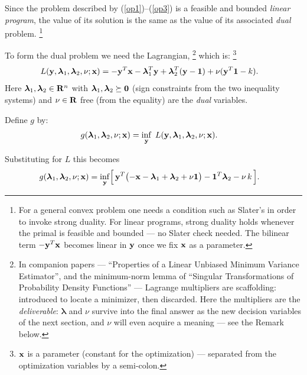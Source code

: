 \documentclass[12pt]{article}
\begin{document}
Since the problem described by (\ref{op1})--(\ref{op3}) is a feasible and
bounded {\it linear program\/}, the value of its solution is the same as the value of
its associated {\it dual\/} problem.%
\footnote{For a general convex problem one needs a condition such as Slater's
	in order to invoke strong duality.
For linear programs, strong duality holds whenever the primal is feasible and bounded
--- no Slater check needed.
The bilinear term $-{\bf y}^T {\bf x}$ becomes linear in ${\bf y}$ once we fix
${\bf x}$ as a parameter.}

To form the dual problem we need the Lagrangian,%
\footnote{In companion papers --- ``Properties of a Linear Unbiased
Minimum Variance Estimator'', and the minimum-norm lemma of ``Singular
Transformations of Probability Density Functions'' --- Lagrange
multipliers are scaffolding: introduced to locate a minimizer, then
discarded.  Here the multipliers are the {\it deliverable\/}:
${\boldsymbol \lambda}$ and $\nu$ survive into the final answer as the
new decision variables of the next section, and $\nu$ will even acquire
a meaning --- see the Remark below.}
which is:%
\footnote{${\bf x}$ is a parameter (constant for the optimization) --- separated from
the optimization variables by a semi-colon.}
\begin{align*}
	L({\bf y}, {\boldsymbol \lambda}_1, {\boldsymbol \lambda}_2, \nu; {\bf x}) &=
	-{\bf y}^T {\bf x} - {\boldsymbol \lambda}_1^T {\bf y}
	+ {\boldsymbol \lambda}_2^T ({\bf y} - {\bf 1}) + \nu ({\bf y}^T {\bf 1} - k).
\end{align*}
Here ${\boldsymbol \lambda}_1, {\boldsymbol \lambda}_2 \in {\bf R}^n$ with
${\boldsymbol \lambda}_1, {\boldsymbol \lambda}_2 \succeq {\bf 0}$ (sign constraints
from the two inequality systems) and $\nu \in {\bf R}$ free (from the equality)
are the {\it dual\/} variables.

Define $g$ by:
\begin{align*}
	g({\boldsymbol \lambda}_1, {\boldsymbol \lambda}_2, \nu; {\bf x}) &=
		\inf_{\bf y} \; L({\bf y}, {\boldsymbol \lambda}_1, {\boldsymbol \lambda}_2, \nu; {\bf x}).
\end{align*}

Substituting for $L$ this becomes
\begin{align*}
	g({\boldsymbol \lambda}_1, {\boldsymbol \lambda}_2, \nu; {\bf x}) &=
		\inf_{\bf y} \Bigl[\, {\bf y}^T \bigl( -{\bf x} - {\boldsymbol \lambda}_1 + {\boldsymbol \lambda}_2 + \nu {\bf 1} \bigr)
		- {\bf 1}^T {\boldsymbol \lambda}_2 - \nu \, k \,\Bigr].
\end{align*}
\end{document}
